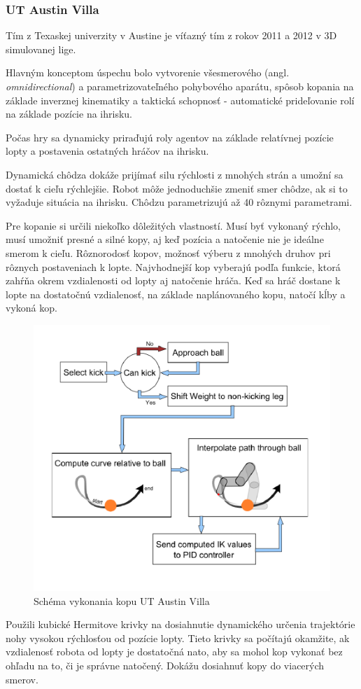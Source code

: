 \subsubsection{UT Austin Villa}
	\label{austin_villa}
Tím z Texaskej univerzity v Austine \cite{villa2013, villa_team, villa2012} je víťazný tím z rokov 2011 a 2012 v 3D simulovanej lige.

Hlavným konceptom úspechu bolo vytvorenie všesmerového (angl. \textit{omnidirectional}) a parametrizovateľného pohybového aparátu, spôsob kopania na základe inverznej kinematiky a taktická schopnosť - automatické prideľovanie rolí na základe pozície na ihrisku. 

Počas hry sa dynamicky priraďujú roly agentov na základe relatívnej pozície lopty a postavenia ostatných hráčov na ihrisku.

Dynamická chôdza dokáže prijímať silu rýchlosti z mnohých strán a umožní sa dostať k cieľu rýchlejšie. Robot môže jednoduchšie zmeniť smer chôdze, ak si to vyžaduje situácia na ihrisku. Chôdzu parametrizujú až 40 rôznymi parametrami. 

Pre kopanie si určili niekoľko dôležitých vlastností. Musí byť vykonaný rýchlo, musí umožniť presné a silné kopy, aj keď pozícia a natočenie nie je ideálne smerom k cieľu. Rôznorodosť kopov, možnosť výberu z mnohých druhov pri rôznych postaveniach k lopte. Najvhodnejší kop vyberajú podľa funkcie, ktorá zahŕňa okrem vzdialenosti od lopty aj natočenie hráča. Keď sa hráč dostane k lopte na dostatočnú vzdialenosť, na základe naplánovaného kopu, natočí kĺby a vykoná kop.

\begin{figure}[H]
	\center
	\includegraphics[scale=1]{./data/kick_arch_austin_villa}
	\caption{Schéma vykonania kopu UT Austin Villa \cite{villa2012}}
	\label{pic_kick_arch_austin_villa}
\end{figure}

Použili kubické Hermitove krivky na dosiahnutie dynamického určenia trajektórie nohy vysokou rýchlosťou od pozície lopty. Tieto krivky sa počítajú okamžite, ak vzdialenosť robota od lopty je dostatočná nato, aby sa mohol kop vykonať bez ohľadu na to, či je správne natočený. Dokážu dosiahnuť kopy do viacerých smerov. 


